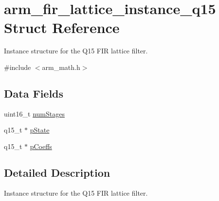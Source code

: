 \hypertarget{structarm__fir__lattice__instance__q15}{\section{arm\-\_\-fir\-\_\-lattice\-\_\-instance\-\_\-q15 Struct Reference}
\label{structarm__fir__lattice__instance__q15}
}


Instance structure for the Q15 F\-I\-R lattice filter.  




{\ttfamily \#include $<$arm\-\_\-math.\-h$>$}

\subsection*{Data Fields}
\begin{DoxyCompactItemize}
\item 
uint16\-\_\-t \hyperlink{structarm__fir__lattice__instance__q15_a4cceb90547b3e585d4c7aabaa8057212}{num\-Stages}
\item 
q15\-\_\-t $\ast$ \hyperlink{structarm__fir__lattice__instance__q15_ae29dfdb736374fcddaeaec4b7770170c}{p\-State}
\item 
q15\-\_\-t $\ast$ \hyperlink{structarm__fir__lattice__instance__q15_a7ca181a37f714d174445f486bebce26f}{p\-Coeffs}
\end{DoxyCompactItemize}


\subsection{Detailed Description}
Instance structure for the Q15 F\-I\-R lattice filter. 

